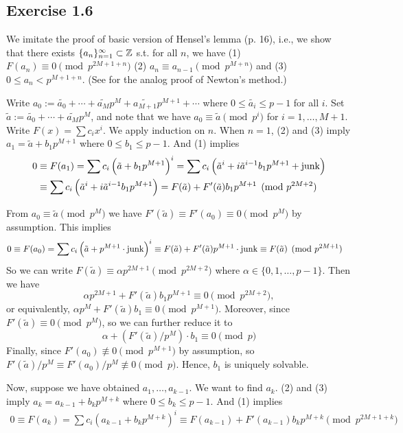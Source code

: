 \documentclass[../Koblitz.tex]{subfiles}
\begin{document}
\subsection*{Exercise 1.6}

We imitate the proof of basic version of Hensel's lemma (p. 16), i.e., we show that there exists $\{a_n\}_{n=1}^\infty\subset\mathbb{Z}$ s.t. for all $n$, we have (1) $F(a_n)\equiv0 \pmod{p^{2M+1+n}}$ (2) $a_n\equiv a_{n-1} \pmod{p^{M+n}}$ and (3) $0\leq a_n < p^{M+1+n}$. (See  for the analog proof of Newton's method.)

Write $a_0 := \tilde{a_0}+\cdots+\tilde{a_M}p^M + \tilde{a_{M+1}}p^{M+1}+\cdots$ where $0\leq\tilde{a_i}\leq p-1$ for all $i$. Set $\tilde{a}:=\tilde{a_0}+\cdots+\tilde{a_M}p^M$, and note that we have $a_0\equiv\tilde{a} \pmod{p^i}$ for $i=1,\ldots,M+1$. Write $F(x)=\sum c_ix^i$. We apply induction on $n$. When $n=1$, (2) and (3) imply $a_1=\tilde{a}+b_1p^{M+1}$ where $0\leq b_1 \leq p-1$. And (1) implies
\begin{align*}
    0 &\equiv F(a_1) = \sum c_i\left(\tilde{a}+b_1p^{M+1}\right)^i = \sum c_i\left(\tilde{a}^i+i\tilde{a}^{i-1}b_1p^{M+1}+\operatorname{junk}\right) \\
    &\equiv \sum c_i\left(\tilde{a}^i+i\tilde{a}^{i-1}b_1p^{M+1}\right) = F(\tilde{a}) + F'(\tilde{a})b_1p^{M+1} \pmod{p^{2M+2}}
\end{align*}

From $a_0 \equiv \tilde{a} \pmod{p^M}$ we have $F'(\tilde{a})\equiv F'(a_0) \equiv 0 \pmod{p^M}$ by assumption. This implies
\begin{align*}
    0\equiv F(a_0) &= \sum c_i\left(\tilde{a} + p^{M+1}\cdot\operatorname{junk}\right)^i \equiv F(\tilde{a}) + F'(\tilde{a})p^{M+1}\cdot\operatorname{junk} \equiv F(\tilde{a}) \pmod{p^{2M+1}}
\end{align*}
So we can write $F(\tilde{a})\equiv \alpha p^{2M+1} \pmod{p^{2M+2}}$ where $\alpha\in\{0,1,\ldots,p-1\}$. Then we have $$\alpha p^{2M+1} + F'(\tilde{a})b_1p^{M+1} \equiv 0 \pmod{p^{2M+2}},$$ or equivalently, $\alpha p^M+F'(\tilde{a})b_1\equiv 0\pmod{p^{M+1}}$. Moreover, since $F'(\tilde{a})\equiv 0 \pmod{p^M}$, so we can further reduce it to $$\alpha+(F'(\tilde{a})/p^M)\cdot b_1 \equiv 0\pmod{p}$$ Finally, since $F'(a_0)\not\equiv 0 \pmod{p^{M+1}}$ by assumption, so $F'(\tilde{a})/p^M \equiv F'(a_0)/p^M\not\equiv 0 \pmod{p}$. Hence, $b_1$ is uniquely solvable.

Now, suppose we have obtained $a_1,\ldots,a_{k-1}$. We want to find $a_k$. (2) and (3) imply $a_k=a_{k-1}+b_kp^{M+k}$ where $0\leq b_k\leq p-1$. And (1) implies
\begin{align*}
    0\equiv F(a_k) = \sum c_i\left(a_{k-1}+b_kp^{M+k}\right)^i \equiv F(a_{k-1})+F'(a_{k-1})b_kp^{M+k} \pmod{p^{2M+1+k}}
\end{align*}
\end{document}
